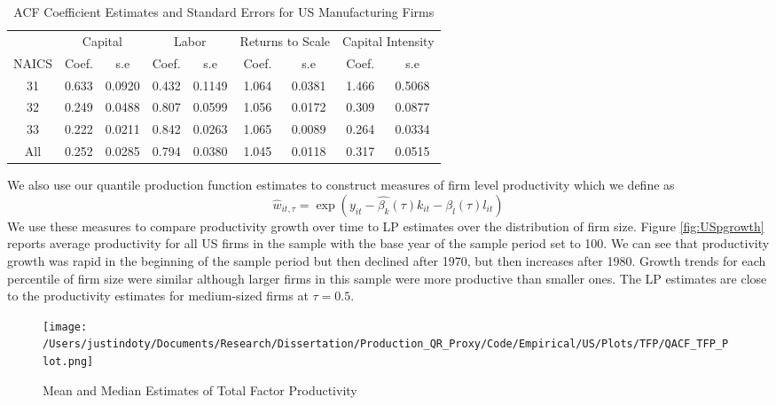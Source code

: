 \documentclass[11pt]{article}
\begin{document}
\begin{table}[H]
\centering
\caption{ACF Coefficient Estimates and Standard Errors for US Manufacturing Firms}
\begin{tabular}{ccccccccc}
  \hline\hline & \multicolumn{2}{c}{Capital} & \multicolumn{2}{c}{Labor} & \multicolumn{2}{c}{Returns to Scale} & \multicolumn{2}{c}{Capital Intensity}\\ \cmidrule(lr){2-3} \cmidrule(lr){4-5} \cmidrule(lr){6-7} \cmidrule(lr){8-9}NAICS & Coef. & s.e & Coef. & s.e & Coef. & s.e & Coef. & s.e \\ 
  \hline
31 & 0.633 & 0.0920 & 0.432 & 0.1149 & 1.064 & 0.0381 & 1.466 & 0.5068 \\ 
  32 & 0.249 & 0.0488 & 0.807 & 0.0599 & 1.056 & 0.0172 & 0.309 & 0.0877 \\ 
  33 & 0.222 & 0.0211 & 0.842 & 0.0263 & 1.065 & 0.0089 & 0.264 & 0.0334 \\ 
  All & 0.252 & 0.0285 & 0.794 & 0.0380 & 1.045 & 0.0118 & 0.317 & 0.0515 \\ 
   \hline
\end{tabular}
\label{USACFCoef}
\end{table}

We also use our quantile production function estimates to construct measures of firm level productivity which we define as
\begin{equation}
\hat{w}_{it,\tau}=\exp(y_{it}-\hat{\beta_{k}}(\tau)k_{it}-\hat{\beta_{l}}(\tau)l_{it})
\end{equation}
We use these measures to compare productivity growth over time to LP estimates over the distribution of firm size. Figure \ref{fig:USpgrowth} reports average productivity for all US firms in the sample with the base year of the sample period set to 100. We can see that productivity growth was rapid in the beginning of the sample period but then declined after 1970, but then increases after 1980. Growth trends for each percentile of firm size were similar although larger firms in this sample were more productive than smaller ones. The LP estimates are close to the productivity estimates for medium-sized firms at $\tau=0.5$.

\begin{figure}[H]
\centering
\caption{Mean and Median Estimates of Total Factor Productivity}
\texttt{[image: /Users/justindoty/Documents/Research/Dissertation/Production\_QR\_Proxy/Code/Empirical/US/Plots/TFP/QACF\_TFP\_Plot.png]}
\label{fig:ACFUSTFPDens}
\end{figure}
\end{document}
